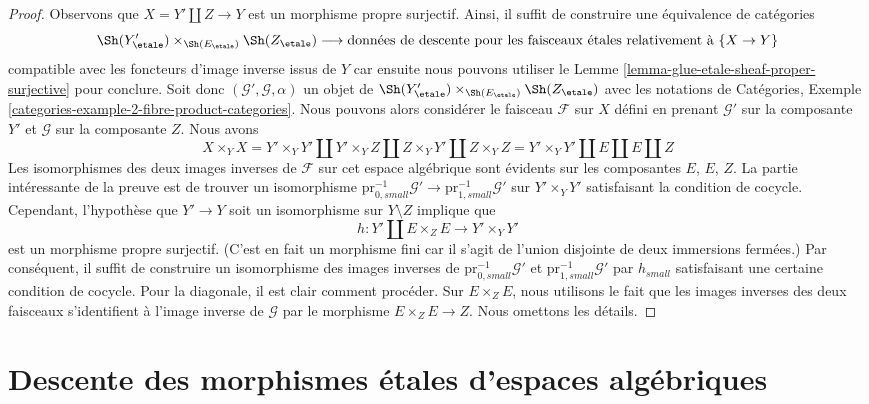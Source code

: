 \begin{proof}
Observons que $X = Y' \coprod Z \to Y$ est un morphisme propre surjectif.
Ainsi, il suffit de construire une équivalence de catégories
$$
\Sh(Y'_\etale) \times_{\Sh(E_\etale)} \Sh(Z_\etale)
\longrightarrow
\text{données de descente pour les faisceaux \'etales relativement à }\{X \to Y\}
$$
compatible avec les foncteurs d'image inverse issus de $Y$
car ensuite nous pouvons utiliser le Lemme \ref{lemma-glue-etale-sheaf-proper-surjective}
pour conclure. Soit donc $(\mathcal{G}', \mathcal{G}, \alpha)$ un
objet de $\Sh(Y'_\etale) \times_{\Sh(E_\etale)} \Sh(Z_\etale)$ avec
les notations de Catégories, Exemple
\ref{categories-example-2-fibre-product-categories}.
Nous pouvons alors considérer le faisceau $\mathcal{F}$ sur $X$ défini
en prenant $\mathcal{G}'$ sur la composante $Y'$ et $\mathcal{G}$
sur la composante $Z$. Nous avons
$$
X \times_Y X = Y' \times_Y Y' \amalg
Y' \times_Y Z \amalg Z \times_Y Y' \amalg Z \times_Y Z =
Y' \times_Y Y' \amalg E \amalg E \amalg Z
$$
Les isomorphismes des deux images inverses de $\mathcal{F}$ sur cet espace algébrique sont évidents sur les composantes $E$, $E$, $Z$. La partie intéressante de la preuve est de trouver un isomorphisme
$\text{pr}_{0, small}^{-1}\mathcal{G}' \to
\text{pr}_{1, small}^{-1}\mathcal{G}'$
sur $Y' \times_Y Y'$ satisfaisant la condition de cocycle. Cependant, l'hypothèse que $Y' \to Y$ soit un isomorphisme sur $Y \setminus Z$ implique que $$
h : Y' \coprod E \times_Z E \longrightarrow Y' \times_Y Y'
$$ est un morphisme propre surjectif. (C'est en fait un morphisme fini car il s'agit de l'union disjointe de deux immersions fermées.) Par conséquent, il suffit de construire un isomorphisme des images inverses de $\text{pr}_{0, small}^{-1}\mathcal{G}'$ et $\text{pr}_{1, small}^{-1}\mathcal{G}'$ par $h_{small}$ satisfaisant une certaine condition de cocycle. Pour la diagonale, il est clair comment procéder. Sur $E \times_Z E$, nous utilisons le fait que les images inverses des deux faisceaux s'identifient à l'image inverse de $\mathcal{G}$ par le morphisme $E \times_Z E \to Z$. Nous omettons les détails. 
\end{proof}






\section{Descente des morphismes \'etales d'espaces algébriques}
\label{section-descending-etale}

